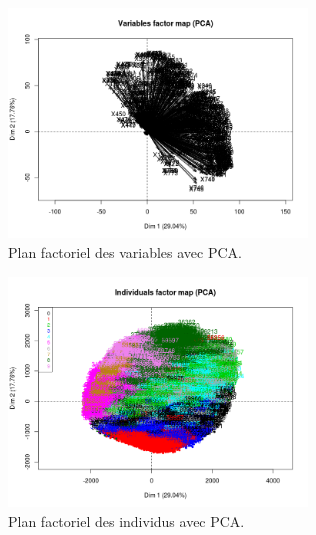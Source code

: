 \documentclass{article}
\begin{document}
\begin{figure}[H] 
\centering
\includegraphics[width=300]{pca_var_factor_map.png}
\caption{Plan factoriel des variables avec PCA.}
\label{fig:pca_var}
\end{figure}

\begin{figure}[H] 
\centering
\includegraphics[width=300]{pca_ind_factor_map.png}
\caption{Plan factoriel des individus avec PCA.}
\label{fig:pca_ind}
\end{figure}
\end{document}
